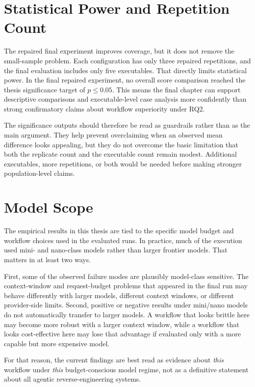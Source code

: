 \section{Statistical Power and Repetition Count}

The repaired final experiment improves coverage, but it does not remove the small-sample problem. Each configuration has only three repaired repetitions, and the final evaluation includes only five executables. That directly limits statistical power. In the final repaired experiment, no overall score comparison reached the thesis significance target of $p \le 0.05$. This means the final chapter can support descriptive comparisons and executable-level case analysis more confidently than strong confirmatory claims about workflow superiority under RQ2.

The significance outputs should therefore be read as guardrails rather than as the main argument. They help prevent overclaiming when an observed mean difference looks appealing, but they do not overcome the basic limitation that both the replicate count and the executable count remain modest. Additional executables, more repetitions, or both would be needed before making stronger population-level claims.

\section{Model Scope}

The empirical results in this thesis are tied to the specific model budget and workflow choices used in the evaluated runs. In practice, much of the execution used mini- and nano-class models rather than larger frontier models. That matters in at least two ways.

First, some of the observed failure modes are plausibly model-class sensitive. The context-window and request-budget problems that appeared in the final run may behave differently with larger models, different context windows, or different provider-side limits. Second, positive or negative results under mini/nano models do not automatically transfer to larger models. A workflow that looks brittle here may become more robust with a larger context window, while a workflow that looks cost-effective here may lose that advantage if evaluated only with a more capable but more expensive model.

For that reason, the current findings are best read as evidence about \emph{this} workflow under \emph{this} budget-conscious model regime, not as a definitive statement about all agentic reverse-engineering systems.

